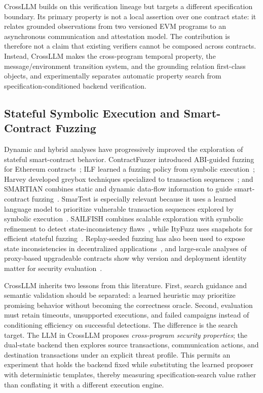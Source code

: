 \documentclass[journal]{IEEEtran}
\theoremstyle{definition}
\begin{document}
CrossLLM builds on this verification lineage but targets a different specification boundary. Its primary property is not a local assertion over one contract state: it relates grounded observations from two versioned EVM programs to an asynchronous communication and attestation model. The contribution is therefore not a claim that existing verifiers cannot be composed across contracts. Instead, CrossLLM makes the cross-program temporal property, the message/environment transition system, and the grounding relation first-class objects, and experimentally separates automatic property search from specification-conditioned backend verification.

\subsection{Stateful Symbolic Execution and Smart-Contract Fuzzing}

Dynamic and hybrid analyses have progressively improved the exploration of stateful smart-contract behavior. ContractFuzzer introduced ABI-guided fuzzing for Ethereum contracts~\cite{jiang2018contractfuzzer}; ILF learned a fuzzing policy from symbolic execution~\cite{he2019ilf}; Harvey developed greybox techniques specialized to transaction sequences~\cite{wustholz2020harvey}; and SMARTIAN combines static and dynamic data-flow information to guide smart-contract fuzzing~\cite{choi2021smartian}. SmarTest is especially relevant because it uses a learned language model to prioritize vulnerable transaction sequences explored by symbolic execution~\cite{so2021smartest}. SAILFISH combines scalable exploration with symbolic refinement to detect state-inconsistency flaws~\cite{bose2022sailfish}, while ItyFuzz uses snapshots for efficient stateful fuzzing~\cite{shou2023ityfuzz}. Replay-seeded fuzzing has also been used to expose state inconsistencies in decentralized applications~\cite{ye2023dappstate}, and large-scale analyses of proxy-based upgradeable contracts show why version and deployment identity matter for security evaluation~\cite{bodell2023proxy}.

CrossLLM inherits two lessons from this literature. First, search guidance and semantic validation should be separated: a learned heuristic may prioritize promising behavior without becoming the correctness oracle. Second, evaluation must retain timeouts, unsupported executions, and failed campaigns instead of conditioning efficiency on successful detections. The difference is the search target. The LLM in CrossLLM proposes \emph{cross-program security properties}; the dual-state backend then explores source transactions, communication actions, and destination transactions under an explicit threat profile. This permits an experiment that holds the backend fixed while substituting the learned proposer with deterministic templates, thereby measuring specification-search value rather than conflating it with a different execution engine.
\end{document}

